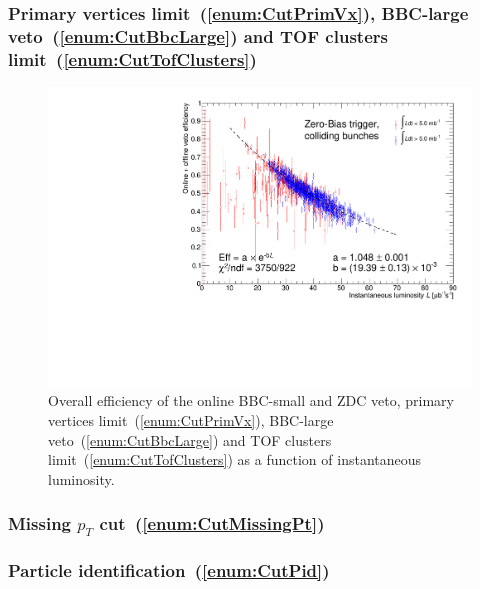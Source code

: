 \subsubsection{Primary vertices limit~(\ref{enum:CutPrimVx}), BBC-large veto~(\ref{enum:CutBbcLarge}) and TOF clusters limit~(\ref{enum:CutTofClusters})}\label{sec:offlineVetoEff}
\begin{figure}[ht!]
\centering%
\includegraphics[width=0.65\linewidth,page=1]{graphics/corrections/OnlineAndOfflineVetoEffVsInstLumi_graph.pdf}%
\caption{Overall efficiency of the online BBC-small and ZDC veto, primary vertices limit~(\ref{enum:CutPrimVx}), BBC-large veto~(\ref{enum:CutBbcLarge}) and TOF clusters limit~(\ref{enum:CutTofClusters}) as a function of instantaneous luminosity.}\label{fig:onlineAndOfflineVetoEff}%
\end{figure}
\subsubsection{Missing \texorpdfstring{$p_{T}$}{pT} cut~(\ref{enum:CutMissingPt})}
\subsubsection{Particle identification~(\ref{enum:CutPid})}


